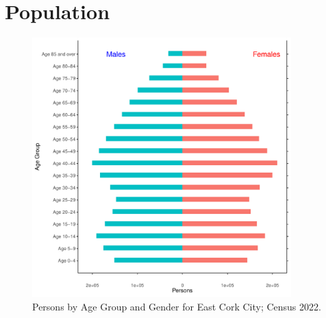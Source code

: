 \documentclass{article}
\begin{document}
\pagebreak

\section{Population} 
\label{sect:Pop}

\begin{figure}[h]
	\centering
	\includegraphics[width = 100mm]{../figures/PyramidPlot.pdf}
	\caption{Persons by Age Group and Gender for East Cork City; Census 2022.}
	\label{fig:2ae19629-1a6a-13a3-e055-000000000001}
	\end{figure}
\end{document}

